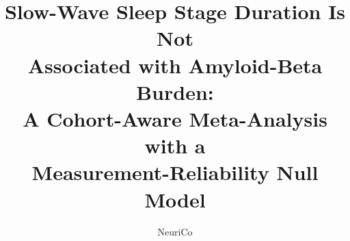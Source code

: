 \documentclass{article}
\title{Slow-Wave Sleep Stage Duration Is Not\\ Associated with Amyloid-Beta Burden:\\ A Cohort-Aware Meta-Analysis with a\\ Measurement-Reliability Null Model}
\author{NeuriCo}
\begin{document}
\maketitle

\begin{abstract}

\end{abstract}










\appendix

\end{document}

